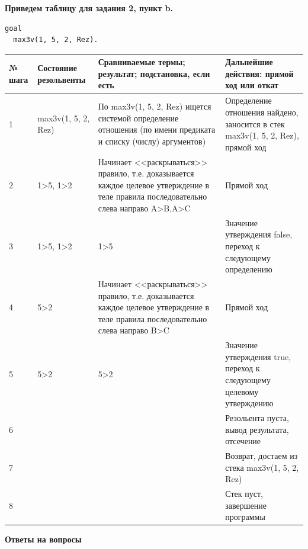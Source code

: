 \documentclass[a4paper,14pt]{extreport} %
\begin{document}
\hfill

\textbf{Приведем таблицу для задания 2, пункт b. }
\begin{lstlisting}
goal
  max3v(1, 5, 2, Rez).
\end{lstlisting}

\begin{longtable}{|p{0.5cm}|p{4cm}|p{7cm}|p{5.5cm}|}
	\hline
 	№ шага & Состояние резольвенты & Сравниваемые термы; результат; подстановка, если есть  & Дальнейшие действия: прямой ход или откат \\ \hline
	1 & max3v(1, 5, 2, Rez) & По max3v(1, 5, 2, Rez) ищется системой определение отношения (по имени предиката и списку (числу) аргументов) & Определение отношения найдено, заносится в стек max3v(1, 5, 2, Rez), прямой ход \\ \hline
	2 &1>5, 1>2& Начинает <<раскрываться>> правило, т.е. доказывается каждое целевое утверждение в теле правила последовательно слева направо
	A>B,A>C
	
	& Прямой ход\\ \hline
	
	3 &1>5, 1>2& 1>5	
	& Значение утверждения false, переход к следующему определению\\ \hline

	4 &5>2& Начинает <<раскрываться>> правило, т.е. доказывается каждое целевое утверждение в теле правила последовательно слева направо
	B>C
	
	& Прямой ход\\ \hline
	5 &5>2& 5>2 & Значение утверждения true, переход к следующему целевому утверждению\\ \hline
	6 && & Резольента пуста, вывод результата, отсечение\\ \hline

         7&&&Возврат, достаем из стека max3v(1, 5, 2, Rez)  \\ \hline
	8 & &  & Стек пуст, завершение программы \\ \hline

\end{longtable}

\hfill

\textbf{Ответы на вопросы}
\end{document}
